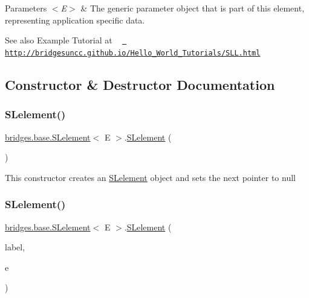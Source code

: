 \begin{DoxyParams}{Parameters}
{\em $<$\+E$>$} & The generic parameter object that is part of this element, representing application specific data.\\
\hline
\end{DoxyParams}
\begin{DoxySeeAlso}{See also}
Example Tutorial at ~\newline
 \href{http://bridgesuncc.github.io/Hello_World_Tutorials/SLL.html}{\texttt{ http\+://bridgesuncc.\+github.\+io/\+Hello\+\_\+\+World\+\_\+\+Tutorials/\+S\+L\+L.\+html}} 
\end{DoxySeeAlso}


\subsection{Constructor \& Destructor Documentation}
\mbox{\label{classbridges_1_1base_1_1_s_lelement_ab9c8a08dadd76d7e0c29d7c41cf277c4}} 
\subsubsection{\texorpdfstring{SLelement()}{SLelement()}\hspace{0.1cm}{\footnotesize\ttfamily [1/5]}}
{\footnotesize\ttfamily \mbox{\hyperlink{classbridges_1_1base_1_1_s_lelement}{bridges.\+base.\+S\+Lelement}}$<$ E $>$.\mbox{\hyperlink{classbridges_1_1base_1_1_s_lelement}{S\+Lelement}} (\begin{DoxyParamCaption}{ }\end{DoxyParamCaption})}

This constructor creates an \mbox{\hyperlink{classbridges_1_1base_1_1_s_lelement}{S\+Lelement}} object and sets the next pointer to null \mbox{\label{classbridges_1_1base_1_1_s_lelement_a8e32c9b9e8fc8f9f1eccb14b97e031e7}} 
\subsubsection{\texorpdfstring{SLelement()}{SLelement()}\hspace{0.1cm}{\footnotesize\ttfamily [2/5]}}
{\footnotesize\ttfamily \mbox{\hyperlink{classbridges_1_1base_1_1_s_lelement}{bridges.\+base.\+S\+Lelement}}$<$ E $>$.\mbox{\hyperlink{classbridges_1_1base_1_1_s_lelement}{S\+Lelement}} (\begin{DoxyParamCaption}\item[{String}]{label,  }\item[{E}]{e }\end{DoxyParamCaption})}

